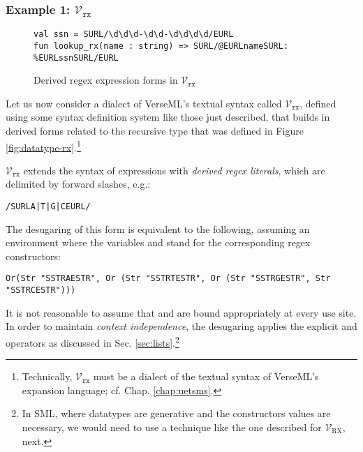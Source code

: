 \subsubsection{Example 1: $\mathcal{V}_\texttt{rx}$}
\begin{figure}
\begin{lstlisting}[numbers=none]
val ssn = SURL/\d\d\d-\d\d-\d\d\d\d/EURL
fun lookup_rx(name : string) => SURL/@EURLnameSURL: %EURLssnSURL/EURL
\end{lstlisting}
\caption{Derived regex expression forms in $\mathcal{V}_\texttt{rx}$}
\label{fig:derived-spliced-subexpressions}
\end{figure}
Let us now consider a dialect of VerseML's textual syntax called $\mathcal{V}_\texttt{rx}$, defined using some syntax definition system like those just described, that  builds in derived forms related to the recursive type  that was defined in Figure \ref{fig:datatype-rx}.\footnote{Technically, $\mathcal{V}_\texttt{rx}$ must be a dialect of the textual syntax of VerseML's expansion language; cf. Chap. \ref{chap:uetsms}.}

$\mathcal{V}_\texttt{rx}$ extends the syntax of expressions with  \emph{derived regex literals}, which are delimited by forward slashes, e.g.:
\begin{lstlisting}[numbers=none]
/SURLA|T|G|CEURL/
\end{lstlisting}
The desugaring of this form is equivalent to the following, assuming an environment where the variables  and  stand for the corresponding regex constructors:
\begin{lstlisting}[numbers=none]
Or(Str "SSTRAESTR", Or (Str "SSTRTESTR", Or (Str "SSTRGESTR", Str "SSTRCESTR")))
\end{lstlisting}
It is not reasonable to assume that  and  are bound appropriately at every use site. In order to maintain \emph{context independence}, the desugaring applies the explicit  and  operators as discussed in Sec. \ref{sec:lists}.\footnote{In SML, where datatypes are generative and the constructors values are necessary, we would need to use a technique like the one described for $\mathcal{V}_\text{RX}$, next.}



